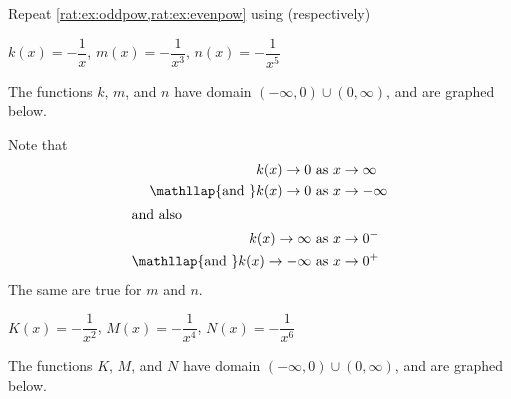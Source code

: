 	 \begin{doyouunderstand}
		 \begin{problem}
		 Repeat \cref{rat:ex:oddpow,rat:ex:evenpow} using (respectively)
		 \begin{subproblem}
			 $k(x)=-\dfrac{1}{x}$, $ m(x)=-\dfrac{1}{x^3}$, $ n(x)=-\dfrac{1}{x^5}$
			 \begin{shortsolution}
				 The functions $k$, $m$, and $n$ have domain $(-\infty,0)\cup (0,\infty)$, and
				 are graphed below.


				 Note that
				 \begin{align*}
					 k(x)\rightarrow 0                                & \text{ as } x\rightarrow\infty  \\
					 \mathllap{\text{and }}    k(x)\rightarrow 0      & \text{ as } x\rightarrow-\infty \\
					 \intertext{and also}
					 k(x)\rightarrow \infty                           & \text{ as } x\rightarrow 0^-    \\
					 \mathllap{\text{and }}   k(x)\rightarrow -\infty & \text{ as } x\rightarrow 0^+
				 \end{align*}
				 The same are true for $m$ and $n$.
			 \end{shortsolution}
		 \end{subproblem}
		 \begin{subproblem}
			 $ K(x)=-\dfrac{1}{x^2}$, $ M(x)=-\dfrac{1}{x^4}$, $ N(x)=-\dfrac{1}{x^6}$
			 \begin{shortsolution}
				 The functions $K$, $M$, and $N$ have domain $(-\infty,0)\cup (0,\infty)$, and
				 are graphed below.


\end{shortsolution}
\end{subproblem}
\end{problem}
\end{doyouunderstand}
